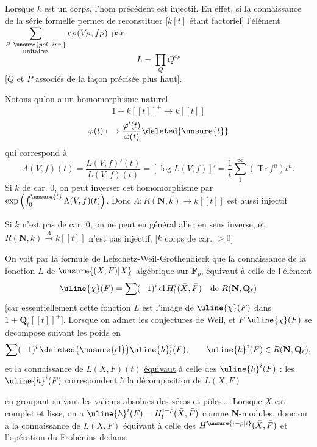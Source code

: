 Lorsque $k$ est un corps, l'hom
précédent est injectif. En effet, si
 la connaissance de la
série formelle permet de reconstituer 
[$k[t]$
étant factoriel] l'élément
$\displaystyle\sum_{\substack{P\ \unsure{pol.|irr.}\\\mathrm{unitaires}}}c_P(V_P,f_P)$
 par
\[
L=\prod_Q Q^{c_P}
\]
[$Q$ et $P$ associés de
la façon précisée plus haut].

Notons qu'on a un homomorphisme
naturel 
\[
1+k[[t]]^+\longrightarrow k[[t]]
\]
\[
\varphi(t)\longmapsto\frac{\varphi'(t)}{\varphi(t)}\deleted{\unsure{t}}
\]
qui correspond à
\[
\Lambda(V,f)(t)=\frac{L(V,f)'(t)}{L(V,f)(t)}
=[\log L(V,f)]'=\frac1t\sum_1^\infty(\operatorname{Tr}f^n)t^n.
\]
Si $k$ de car. $0$,  on peut inverser cet
homomorphisme par $\exp\left(\int_0^{\unsure{t}}\Lambda(V,f)(t)\right)$.
Donc 
$\Lambda:R(\mathbf N,k)\longrightarrow k[[t]]$ est aussi injectif 

Si $k$ n'est pas de car. $0$, on ne peut en
général aller en sens inverse, et
$R(\mathbf N,k)\xrightarrow{\Lambda}k[[t]]$ n'est  pas injectif,
[$k$ corps de car. $>0$]


On voit  par la formule de
Lefschetz-Weil-Grothendieck que la connaissance
de la fonction $L$ de $\unsure{(X,F)|X}$ algébrique
sur $\mathbf F_p$,  \uline{équivaut} à celle de l'élément
\[
\uline{\chi}(F)=\sum(-1)^i\,\mathrm{cl}\,H^i_!(\bar X,\bar F)
\quad\text{de }R(\mathbf N,\mathbf Q_\ell)
\]
[car essentiellement cette fonction $L$ est l'image
de $\uline{\chi}(F)$ dans $1+\mathbf Q_\ell[[t]]^+$]. Lorsque
on admet les conjectures de Weil, et $F$
$\uline{\chi}(F)$ se décompose suivant les poids en
\[
\sum(-1)^i\,\deleted{\unsure{\mathrm{cl}}}\uline{h}^i_!(F),
\qquad\uline{h}^i(F)\in R(\mathbf N,\mathbf Q_\ell),
\]
et la  connaissance de $L(X,F)(t)$
\uline{équivaut} à celle des $\uline{h}^i(F)$ : les $\uline{h}^i(F)$
correspondent à la décomposition de $L(X,F)$

 en groupant suivant les valeurs absolues
des zéros et pôles\ldots. Lorsque $X$ est
complet et lisse, 
on a $\uline{h}^i(F)=H^{i-\rho}_!(\bar X,\bar F)$
comme $\mathbf N$-modules, donc on a la
connaissance de $L(X,F)$ équivaut à celle des
$H^{\unsure{i-\rho|i}}(\bar X,\bar F)$ et l'opération du Frobénius dedans.

